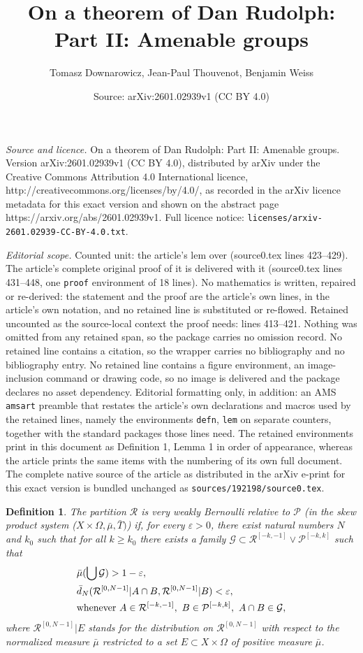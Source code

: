 \documentclass[10pt,a4paper]{amsart}
\title{On a theorem of Dan Rudolph: Part II: Amenable groups}
\author{Tomasz Downarowicz, Jean-Paul Thouvenot, Benjamin Weiss}
\date{Source: arXiv:2601.02939v1 (CC BY 4.0)}
\newtheorem{defn}{Definition}
\def \G {\mathcal G}
\def \P {\mathcal P}
\def \R {\mathcal R}
\def \eps {\varepsilon}
\begin{document}
\maketitle

\noindent\emph{Source and licence.} On a theorem of Dan Rudolph: Part II: Amenable groups. Version arXiv:2601.02939v1 (CC BY 4.0), distributed by arXiv under the Creative Commons Attribution 4.0 International licence, http://creativecommons.org/licenses/by/4.0/, as recorded in the arXiv licence metadata for this exact version and shown on the abstract page https://arxiv.org/abs/2601.02939v1. Full licence notice: \texttt{licenses/arxiv-2601.02939-CC-BY-4.0.txt}.\par\smallskip

\noindent\textit{Editorial scope.} Counted unit: the article's lem over (source0.tex lines 423--429). The article's complete original proof of it is delivered with it (source0.tex lines 431--448, one \texttt{proof} environment of 18 lines). No mathematics is written, repaired or re-derived: the statement and the proof are the article's own lines, in the article's own notation, and no retained line is substituted or re-flowed.  Retained uncounted as the source-local context the proof needs: lines 413--421.  Nothing was omitted from any retained span, so the package carries no omission record.  No retained line contains a citation, so the wrapper carries no bibliography and no bibliography entry.  No retained line contains a figure environment, an image-inclusion command or drawing code, so no image is delivered and the package declares no asset dependency.  Editorial formatting only, in addition: an AMS \texttt{amsart} preamble that restates the article's own declarations and macros used by the retained lines, namely the environments \texttt{defn}, \texttt{lem} on separate counters, together with the standard packages those lines need.  The retained environments print in this document as Definition 1, Lemma 1 in order of appearance, whereas the article prints the same items with the numbering of its own full document.  The complete native source of the article as distributed in the arXiv e-print for this exact version is bundled unchanged as \texttt{sources/192198/source0.tex}.
\begin{defn}\label{VWB}
The partition $\R$ is very weakly Bernoulli relative to $\P$ (in the skew product system ($X\times\Omega,\bar\mu,\bar T)$) if, for every $\eps>0$, there exist natural numbers $N$ and $k_0$ such that for all $k\ge k_0$ there exists a family $\G\subset\R^{[-k,-1]}\vee\P^{[-k,k]}$ such that
\begin{align}
&\bar\mu(\bigcup\G)>1-\eps,\label{aa}\\
&\bar d_N(\R^{[0,N-1]}|A\cap B, \R^{[0,N-1]}|B)<\eps,\label{bb}\\ 
&\text{whenever }A\in\R^{[-k,-1]},\ B\in\P^{[-k,k]},\ A\cap B\in\G,\notag
\end{align}
where $\R^{[0,N-1]}|E$ stands for the distribution on $\R^{[0,N-1]}$ with respect to the normalized measure $\bar\mu$ restricted to a set $E\subset X\times\Omega$ of positive measure $\bar\mu$. 
\end{defn}
\end{document}
